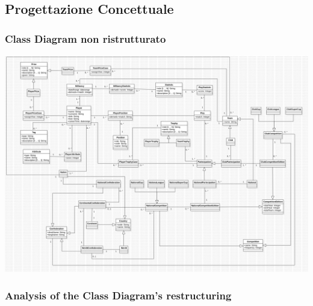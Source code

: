 \subsection{Progettazione Concettuale}

\newpage

\subsubsection{Class Diagram non ristrutturato}

\includegraphics[width=\textwidth]{res/class_diagram_not_restr}
\newpage

\subsubsection{Analysis of the Class Diagram's restructuring}
\newpage
